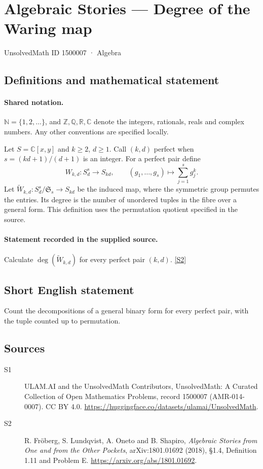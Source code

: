 \documentclass[11pt]{article}
\newcommand{\sref}[2]{\hyperlink{source:#1:#2}{[S#2]}}
\begin{document}
\setcounter{section}{1500006}
\section{Algebraic Stories — Degree of the Waring map}\label{1500007}
{\small\sffamily UnsolvedMath ID 1500007 · Algebra}
\subsection{Definitions and mathematical statement}

\paragraph{Shared notation.}$\mathbb N=\{1,2,\ldots\}$, and $\mathbb Z,\mathbb Q,\mathbb R,\mathbb C$ denote the integers, rationals, reals and complex numbers. Any other conventions are specified locally.


Let $S=\mathbb C[x,y]$ and $k\geq2$, $d\geq1$. Call $(k,d)$ perfect when $s=(kd+1)/(d+1)$ is an integer. For a perfect pair define
\[W_{k,d}:S_d^s\longrightarrow S_{kd},\qquad(g_1,\ldots,g_s)\longmapsto\sum_{j=1}^sg_j^k.
\]
Let $\widetilde W_{k,d}:S_d^s/\mathfrak S_s\to S_{kd}$ be the induced map, where the symmetric group permutes the entries. Its degree is the number of unordered tuples in the fibre over a general form. This definition uses the permutation quotient specified in the source.
\paragraph{Statement recorded in the supplied source.}
Calculate $\deg(\widetilde W_{k,d})$ for every perfect pair $(k,d)$. \sref{1500007}{2}
\subsection{Short English statement}
Count the decompositions of a general binary form for every perfect pair, with the tuple counted up to permutation.
\subsection{Sources}
\begin{description}
\item[\hypertarget{source:1500007:1}{S1}] ULAM.AI and the UnsolvedMath Contributors, UnsolvedMath: A Curated Collection of Open Mathematics Problems, record 1500007 (AMR-014-0007). CC BY 4.0. \url{https://huggingface.co/datasets/ulamai/UnsolvedMath}.
\item[\hypertarget{source:1500007:2}{S2}] R. Fröberg, S. Lundqvist, A. Oneto and B. Shapiro, \emph{Algebraic Stories from One and from the Other Pockets}, arXiv:1801.01692 (2018), §1.4, Definition 1.11 and Problem E. \url{https://arxiv.org/abs/1801.01692}.
\end{description}
\label{end:1500007}
\end{document}
